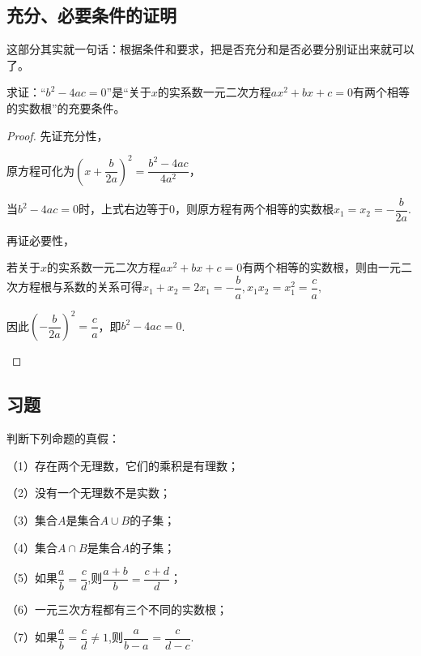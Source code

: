 \documentclass[lang=cn,math=cm,chinesefont=nofont,11pt,scheme=chinese,onecol]{elegantbook}
\begin{document}
\subsection{充分、必要条件的证明}

这部分其实就一句话：根据条件和要求，把是否充分和是否必要分别证出来就可以了。

\begin{example}\label{HS2FZ_lkb1_P26.1}
  求证：“$b^2-4ac=0$”是“关于$x$的实系数一元二次方程$ax^2+bx+c=0$有两个相等的实数根”的充要条件。
\end{example}

\begin{proof}
  先证充分性，

  原方程可化为$\left(x+\dfrac{b}{2a}\right)^{2}=\dfrac{b^{2}-4ac}{4a^{2}}$，

  当$b^2-4ac=0$时，上式右边等于0，则原方程有两个相等的实数根$x_1=x_2=-\dfrac{b}{2a}$.

  再证必要性，
  
\begin{spacing}{1.8}
  若关于$x$的实系数一元二次方程$ax^2+bx+c=0$有两个相等的实数根，则由一元二次方程根与系数的关系可得$x_{1}+x_{2}=2x_{1}=-\dfrac{b}{a},x_{1}x_{2}=x_{1}^{2}=\dfrac{c}{a},$

  因此$\left(-\dfrac{b}{2a}\right)^{2}=\dfrac{c}{a}$，即$b^2-4ac=0$.
\end{spacing}

\end{proof}

\subsection{习题}

\begin{exercise}\label{2017RJB_bx1_P26}
  判断下列命题的真假：

  （1）存在两个无理数，它们的乘积是有理数；

  （2）没有一个无理数不是实数；

  （3）集合$A$是集合$A\cup B$的子集；

  （4）集合$A\cap B$是集合$A$的子集；

\begin{spacing}{2.0}
    （5）如果$\dfrac ab=\dfrac cd$,则$\dfrac{a+b}b=\dfrac{c+d}{d}$；

  （6）一元三次方程都有三个不同的实数根；
  
  （7）如果$\dfrac ab=\dfrac cd\neq 1$,则$\dfrac a{b-a}=\dfrac c{d-c}$.
\end{spacing}

\end{exercise}
\end{document}
